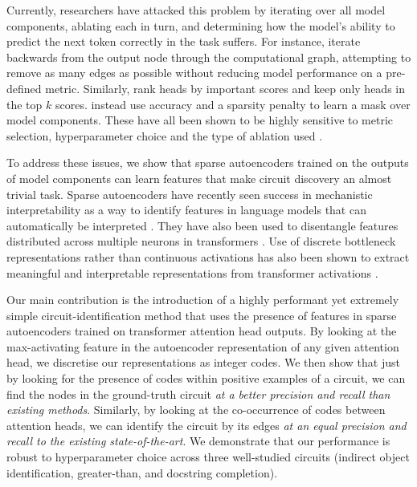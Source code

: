 \documentclass[11pt]{scrartcl}
\begin{document}
Currently, researchers have attacked this problem by iterating over all model components, ablating each in turn, and determining how the model's ability to predict the next token correctly in the task suffers. For instance, \citet{conmy2024towards} iterate backwards from the output node through the computational graph, attempting to remove as many edges as possible without reducing model performance on a pre-defined metric. Similarly, \citet{michel2019sixteen} rank heads by important scores and keep only heads in the top $k$ scores. \citet{cao2021low} instead use accuracy and a sparsity penalty to learn a mask over model components. These have all been shown to be highly sensitive to metric selection, hyperparameter choice and the type of ablation used \citep{conmy2024towards}.

To address these issues, we show that sparse autoencoders trained on the outputs of model components can learn features that make circuit discovery an almost trivial task. Sparse autoencoders have recently seen success in mechanistic interpretability as a way to identify features in language models that can automatically be interpreted \citep{cunningham2023sparse}. They have also been used to disentangle features distributed across multiple neurons in transformers \citep{sharkey2022taking, bricken2023towards, elhage2021mathematical}. Use of discrete bottleneck representations rather than continuous activations has also been shown to extract meaningful and interpretable representations from transformer activations \citep{tamkin2023codebook}.

Our main contribution is the introduction of a highly performant yet extremely simple circuit-identification method that uses the presence of features in sparse autoencoders trained on transformer attention head outputs. By looking at the max-activating feature in the autoencoder representation of any given attention head, we discretise our representations as integer codes. We then show that just by looking for the presence of codes within positive examples of a circuit, we can find the nodes in the ground-truth circuit \textit{at a better precision and recall than existing methods}. Similarly, by looking at the co-occurrence of codes between attention heads, we can identify the circuit by its edges \textit{at an equal precision and recall to the existing state-of-the-art}. We demonstrate that our performance is robust to hyperparameter choice across three well-studied circuits (indirect object identification, greater-than, and docstring completion).
\end{document}
